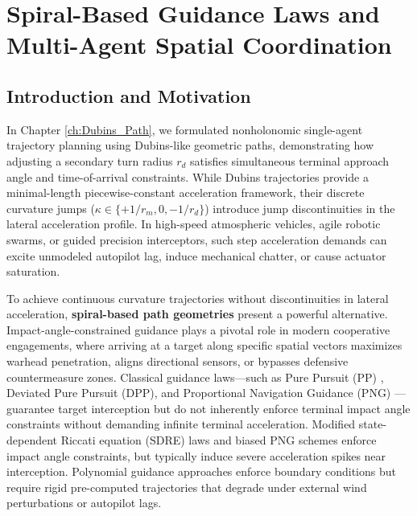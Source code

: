 \chapter[Spiral-Based Guidance Laws and Multi-Agent Spatial Coordination]{Spiral-Based Guidance Laws and Multi-Agent Spatial Coordination}\label{ch:Spiral_Path}
\section{Introduction and Motivation}\label{sec:ch_sp_intro}
In Chapter \ref{ch:Dubins_Path}, we formulated nonholonomic single-agent trajectory planning using Dubins-like geometric paths, demonstrating how adjusting a secondary turn radius $r_d$ satisfies simultaneous terminal approach angle and time-of-arrival constraints. While Dubins trajectories provide a minimal-length piecewise-constant acceleration framework, their discrete curvature jumps ($\kappa \in \{+1/r_m, 0, -1/r_d\}$) introduce jump discontinuities in the lateral acceleration profile. In high-speed atmospheric vehicles, agile robotic swarms, or guided precision interceptors, such step acceleration demands can excite unmodeled autopilot lag, induce mechanical chatter, or cause actuator saturation.

To achieve continuous curvature trajectories without discontinuities in lateral acceleration, \textbf{spiral-based path geometries} present a powerful alternative. Impact-angle-constrained guidance plays a pivotal role in modern cooperative engagements, where arriving at a target along specific spatial vectors maximizes warhead penetration, aligns directional sensors, or bypasses defensive countermeasure zones. Classical guidance laws—such as Pure Pursuit (PP) \cite{SHNEYDOR199847}, Deviated Pure Pursuit (DPP), and Proportional Navigation Guidance (PNG) \cite{SHNEYDOR1998101}— guarantee target interception but do not inherently enforce terminal impact angle constraints without demanding infinite terminal acceleration. Modified state-dependent Riccati equation (SDRE) laws \cite{ratnoo2009SDRE} and biased PNG schemes \cite{Kim2013} enforce impact angle constraints, but typically induce severe acceleration spikes near interception. Polynomial guidance approaches \cite{kim2013time} enforce boundary conditions but require rigid pre-computed trajectories that degrade under external wind perturbations or autopilot lags.

